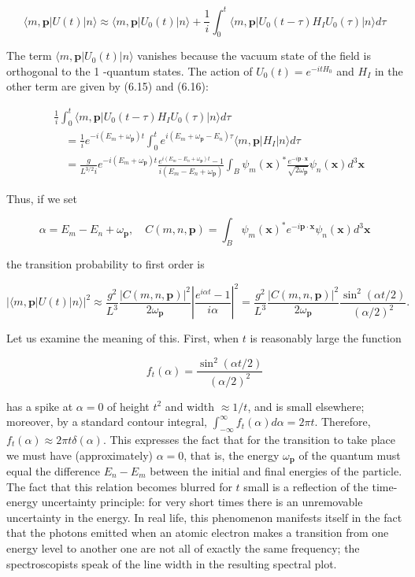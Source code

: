 \documentclass[10pt, letterpaper]{article}
\begin{document}
$$
\langle m, \mathbf{p}| U(t)|n\rangle \approx\langle m, \mathbf{p}| U_{0}(t)|n\rangle+\frac{1}{i} \int_{0}^{t}\langle m, \mathbf{p}| U_{0}(t-\tau) H_{I} U_{0}(\tau)|n\rangle d \tau
$$

The term $\langle m, \mathbf{p}| U_{0}(t)|n\rangle$ vanishes because the vacuum state of the field is orthogonal to the 1 -quantum states. The action of $U_{0}(t)=e^{-i t H_{0}}$ and $H_{I}$ in the other term are given by (6.15) and (6.16):

$$
\begin{aligned}
& \frac{1}{i} \int_{0}^{t}\langle m, \mathbf{p}| U_{0}(t-\tau) H_{I} U_{0}(\tau)|n\rangle d \tau \\
& \quad=\frac{1}{i} e^{-i\left(E_{m}+\omega_{\mathbf{p}}\right) t} \int_{0}^{t} e^{i\left(E_{m}+\omega_{\mathbf{p}}-E_{n}\right) \tau}\langle m, \mathbf{p}| H_{I}|n\rangle d \tau \\
& \quad=\frac{g}{L^{3 / 2} i} e^{-i\left(E_{m}+\omega_{\mathbf{p}}\right) t} \frac{e^{i\left(E_{m}-E_{n}+\omega_{\mathbf{p}}\right) t}-1}{i\left(E_{m}-E_{n}+\omega_{\mathbf{p}}\right)} \int_{B} \psi_{m}(\mathbf{x})^{*} \frac{e^{-i \mathbf{p} \cdot \mathbf{x}}}{\sqrt{2 \omega_{\mathbf{p}}}} \psi_{n}(\mathbf{x}) d^{3} \mathbf{x}
\end{aligned}
$$

Thus, if we set

$$
\alpha=E_{m}-E_{n}+\omega_{\mathbf{p}}, \quad C(m, n, \mathbf{p})=\int_{B} \psi_{m}(\mathbf{x})^{*} e^{-i \mathbf{p} \cdot \mathbf{x}} \psi_{n}(\mathbf{x}) d^{3} \mathbf{x}
$$

the transition probability to first order is

$$
|\langle m, \mathbf{p}| U(t)| n\rangle\left.\right|^{2} \approx \frac{g^{2}}{L^{3}} \frac{|C(m, n, \mathbf{p})|^{2}}{2 \omega_{\mathbf{p}}}\left|\frac{e^{i \alpha t}-1}{i \alpha}\right|^{2}=\frac{g^{2}}{L^{3}} \frac{|C(m, n, \mathbf{p})|^{2}}{2 \omega_{\mathbf{p}}} \frac{\sin ^{2}(\alpha t / 2)}{(\alpha / 2)^{2}} .
$$

Let us examine the meaning of this. First, when $t$ is reasonably large the function

$$
f_{t}(\alpha)=\frac{\sin ^{2}(\alpha t / 2)}{(\alpha / 2)^{2}}
$$

has a spike at $\alpha=0$ of height $t^{2}$ and width $\approx 1 / t$, and is small elsewhere; moreover, by a standard contour integral, $\int_{-\infty}^{\infty} f_{t}(\alpha) d \alpha=2 \pi t$. Therefore, $f_{t}(\alpha) \approx 2 \pi t \delta(\alpha)$. This expresses the fact that for the transition to take place we must have (approximately) $\alpha=0$, that is, the energy $\omega_{\mathbf{p}}$ of the quantum must equal the difference $E_{n}-E_{m}$ between the initial and final energies of the particle. The fact that this relation becomes blurred for $t$ small is a reflection of the time-energy uncertainty principle: for very short times there is an unremovable uncertainty in the energy. In real life, this phenomenon manifests itself in the fact that the photons emitted when an atomic electron makes a transition from one energy level to another one are not all of exactly the same frequency; the spectroscopists speak of the line width in the resulting spectral plot.
\end{document}
